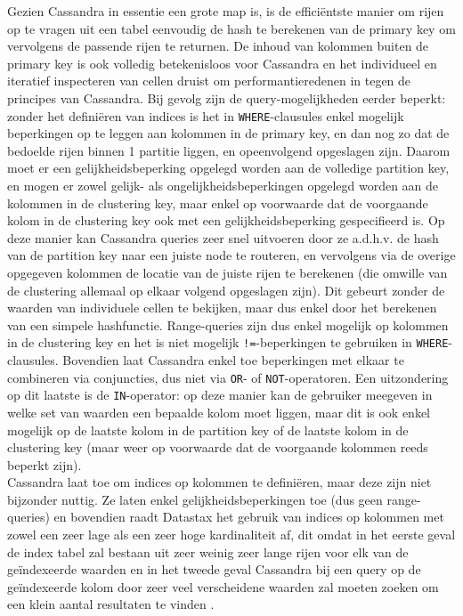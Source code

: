 Gezien Cassandra in essentie een grote map is, is de effici\"entste manier om rijen op te vragen uit een tabel eenvoudig de hash te berekenen van de primary key om vervolgens de passende rijen te returnen. De inhoud van kolommen buiten de primary key is ook volledig betekenisloos voor Cassandra en het individueel en iteratief inspecteren van cellen druist om performantieredenen in tegen de principes van Cassandra. Bij gevolg zijn de query-mogelijkheden eerder beperkt: zonder het defini\"eren van indices is het in \texttt{WHERE}-clausules enkel mogelijk beperkingen op te leggen aan kolommen in de primary key, en dan nog zo dat de bedoelde rijen binnen 1 partitie liggen, en opeenvolgend opgeslagen zijn. Daarom moet er een gelijkheidsbeperking opgelegd worden aan de volledige partition key, en mogen er zowel gelijk- als ongelijkheidsbeperkingen opgelegd worden aan de kolommen in de clustering key, maar enkel op voorwaarde dat de voorgaande kolom in de clustering key ook met een gelijkheidsbeperking gespecifieerd is. Op deze manier kan Cassandra queries zeer snel uitvoeren door ze a.d.h.v. de hash van de partition key naar een juiste node te routeren, en vervolgens via de overige opgegeven kolommen de locatie van de juiste rijen te berekenen (die omwille van de clustering allemaal op elkaar volgend opgeslagen zijn). Dit gebeurt zonder de waarden van individuele cellen te bekijken, maar dus enkel door het berekenen van een simpele hashfunctie. Range-queries zijn dus enkel mogelijk op kolommen in de clustering key en het is niet mogelijk \texttt{!=}-beperkingen te gebruiken in \texttt{WHERE}-clausules. Bovendien laat Cassandra enkel toe beperkingen met elkaar te combineren via conjuncties, dus niet via \texttt{OR}- of \texttt{NOT}-operatoren. Een uitzondering op dit laatste is de \texttt{IN}-operator: op deze manier kan de gebruiker meegeven in welke set van waarden een bepaalde kolom moet liggen, maar dit is ook enkel mogelijk op de laatste kolom in de partition key of de laatste kolom in de clustering key (maar weer op voorwaarde dat de voorgaande kolommen reeds beperkt zijn).\\
Cassandra laat toe om indices op kolommen te defini\"eren, maar deze zijn niet bijzonder nuttig. Ze laten enkel gelijkheidsbeperkingen toe (dus geen range-queries) en bovendien raadt Datastax het gebruik van indices op kolommen met zowel een zeer lage als een zeer hoge kardinaliteit af, dit omdat in het eerste geval de index tabel zal bestaan uit zeer weinig zeer lange rijen voor elk van de ge\"indexeerde waarden en in het tweede geval Cassandra bij een query op de ge\"indexeerde kolom door zeer veel verscheidene waarden zal moeten zoeken om een klein aantal resultaten te vinden \cite{when_to_use_index}.

